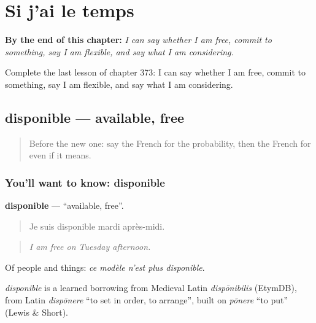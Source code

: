 
\chapter{Si j'ai le temps}
\label{ch:fr-si-j-ai-le-temps}

\begin{chapteropening}
\textbf{By the end of this chapter:} \emph{I can say whether I am free, commit to something, say I am flexible, and say what I am considering.}

Complete the last lesson of chapter 373: I can say whether I am free, commit to something, say I am flexible, and say what I am considering.
\end{chapteropening}

\section[disponible]{disponible — available, free}

\label{lesson:FR-C373-disponible}



\begin{quote}
Before the new one: say the French for the probability, then the French for even if it means.
\end{quote}

\subsection*{You'll want to know: disponible}
\textbf{disponible} — \textquotedblleft{}available, free\textquotedblright{}.

\begin{quote}
Je suis disponible mardi après-midi.
\end{quote}

\begin{quote}
\emph{I am free on Tuesday afternoon.}
\end{quote}

Of people and things: \emph{ce modèle n'est plus disponible}.

\begin{cousinweb}
\emph{disponible} is a learned borrowing from Medieval Latin \emph{dispōnibilis} (EtymDB), from Latin \emph{dispōnere} \textquotedblleft{}to set in order, to arrange\textquotedblright{}, built on \emph{pōnere} \textquotedblleft{}to put\textquotedblright{} (Lewis \& Short).
\end{cousinweb}

